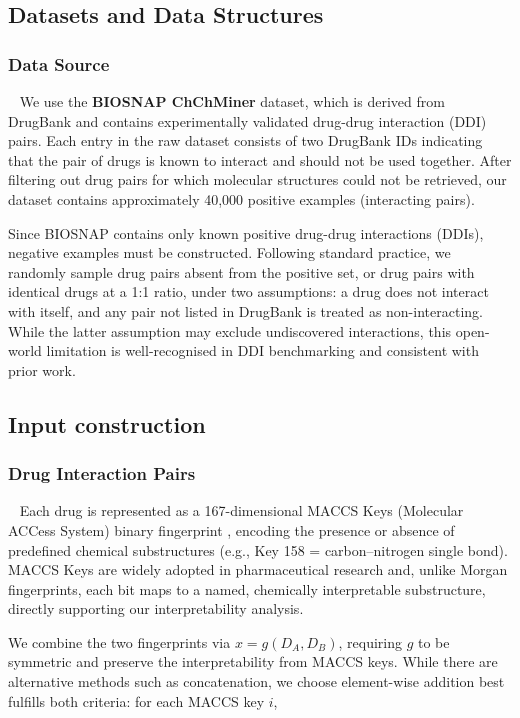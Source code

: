 \documentclass[letterpaper]{article} %
\begin{document}
\subsection{Datasets and Data Structures}

\subsubsection{Data Source}
\ 
\newline
We use the \textbf{BIOSNAP ChChMiner} dataset, which is derived from DrugBank and contains experimentally validated drug-drug interaction (DDI) pairs. Each entry in the raw dataset consists of two DrugBank IDs indicating that the pair of drugs is known to interact and should not be used together. After filtering out drug pairs for which molecular structures could not be retrieved, our dataset contains approximately 40,000 positive examples (interacting pairs). 

Since BIOSNAP contains only known positive drug-drug interactions (DDIs), negative examples must be constructed. Following standard practice, we randomly sample drug pairs absent from the positive set, or drug pairs with identical drugs at a 1:1 ratio, under two assumptions: a drug does not interact with itself, and any pair not listed in DrugBank is treated as non-interacting. While the latter assumption may exclude undiscovered interactions, this open-world limitation is well-recognised in DDI benchmarking and consistent with prior work.\cite{Zitnik2018}

\subsection{Input construction}

\subsubsection{Drug Interaction Pairs}
\
\newline
Each drug is represented as a 167-dimensional MACCS Keys (Molecular ACCess System) binary fingerprint \cite{rdkit}, encoding the presence or absence of predefined chemical substructures (e.g., Key 158 = carbon–nitrogen single bond). MACCS Keys are widely adopted in pharmaceutical research \cite{durant2002reoptimization} and, unlike Morgan fingerprints, each bit maps to a named, chemically interpretable substructure, directly supporting our interpretability analysis. 

We combine the two fingerprints via $x = g(D_A, D_B)$, requiring $g$ to be symmetric and preserve the interpretability from MACCS keys. While there are alternative methods such as concatenation, we choose element-wise addition best fulfills both criteria: for each MACCS key $i$,
\end{document}
